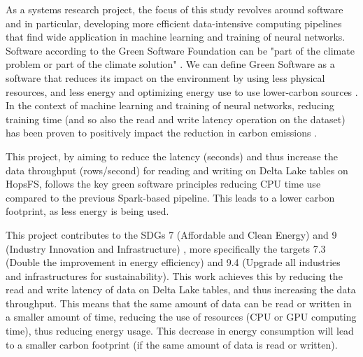As a systems research project, the focus of this study revolves around software and in particular, developing more efficient data-intensive computing pipelines that find wide application in machine learning and training of neural networks. Software according to the Green Software Foundation \cite{GreenSoftwareFoundation} can be "part of the climate problem or part of the climate solution" \cite{WhatGreenSoftware2021}. We can define Green Software as a software that reduces its impact on the environment by using less physical resources, and less energy and optimizing energy use to use lower-carbon sources \cite{WhatGreenSoftware2021}. In the context of machine learning and training of neural networks, reducing training time (and so also the read and write latency operation on the dataset) has been proven to positively impact the reduction in carbon emissions \cite{pattersonCarbonEmissionsLarge2021,pattersonCarbonFootprintMachine2022}.

This project, by aiming to reduce the latency (seconds) and thus increase the data throughput (rows/second) for reading and writing on Delta Lake tables on \gls{HopsFS}, follows the key green software principles reducing \gls{CPU} time use compared to the previous Spark-based pipeline. This leads to a lower carbon footprint, as less energy is being used.

This project contributes to the \glspl{SDG} 7 (Affordable and Clean Energy) and 9 (Industry Innovation and Infrastructure) \cite{SustainableDevelopment}, more specifically the targets 7.3 (Double the improvement in energy efficiency) and 9.4 (Upgrade all industries and infrastructures for sustainability). This work achieves this by reducing the read and write latency of data on Delta Lake tables, and thus increasing the data throughput. This means that the same amount of data can be read or written in a smaller amount of time, reducing the use of resources (\gls{CPU} or \gls{GPU} computing time), thus reducing energy usage. This decrease in energy consumption will lead to a smaller carbon footprint (if the same amount of data is read or written). 


